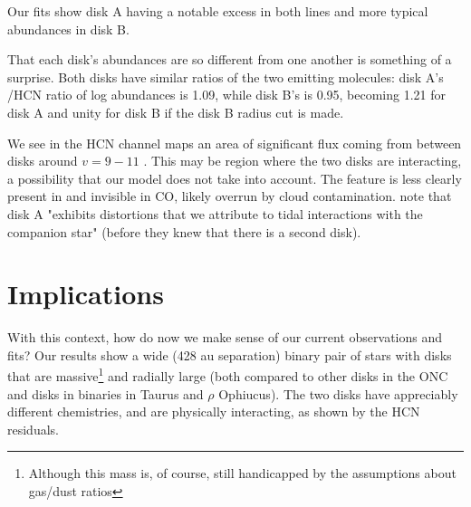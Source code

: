 Our fits show disk A having a notable excess in both lines and more typical abundances in disk B.

That each disk's abundances are so different from one another is something of a surprise. Both disks have similar ratios of the two emitting molecules: disk A's \hco/HCN ratio of log abundances is 1.09, while disk B's is 0.95, becoming 1.21 for disk A and unity for disk B if the disk B radius cut is made.












We see in the HCN channel maps an area of significant flux coming from between disks around $ v = 9-11$ \kms. This may be region where the two disks are interacting, a possibility that our model does not take into account. The feature is less clearly present in \hco and invisible in CO, likely overrun by cloud contamination. \citet{Smith2005} note that disk A "exhibits distortions that we attribute to tidal interactions with the companion star" (before they knew that there is a second disk).













\section{Implications}

With this context, how do now we make sense of our current observations and fits? Our results show a wide (428 au separation) binary pair of stars with disks that are massive\footnote{Although this mass is, of course, still handicapped by the assumptions about gas/dust ratios} and radially large (both compared to other disks in the ONC and disks in binaries in Taurus and $\rho$ Ophiucus). The two disks have appreciably different chemistries, and are physically interacting, as shown by the HCN residuals.


